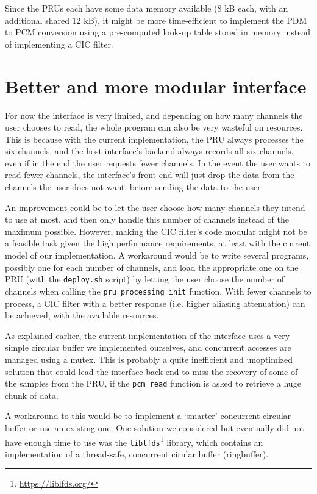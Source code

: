 \documentclass[]{report}
\begin{document}
Since the PRUs each have some data memory available (8 kB each, with an additional shared 12 kB), it might be more time-efficient to implement the PDM to PCM conversion using a pre-computed look-up table stored in memory instead of implementing a CIC filter.

\hypertarget{better-and-more-modular-interface}{%
\section{Better and more modular
interface}\label{better-and-more-modular-interface}}

For now the interface is very limited, and depending on how many channels the user chooses to read, the whole program can also be very wasteful on resources. This is because with the current implementation, the PRU always processes the six channels, and the host interface's backend always records all six channels, even if in the end the user requests fewer channels. In the event the user wants to read fewer channels, the interface's front-end will just drop the data from the channels the user does not want, before sending the data to the user.

An improvement could be to let the user choose how many channels they intend to use at most, and then only handle this number of channels instead of the maximum possible. However, making the CIC filter's code modular might not be a feasible task given the high performance requirements, at least with the current model of our implementation. A workaround would be to write several programs, possibly one for each number of channels, and load the appropriate one on the PRU (with the \texttt{deploy.sh} script) by letting the user choose the number of channels when calling the \texttt{pru\_processing\_init} function. With fewer channels to process, a CIC filter with a better response (i.e. higher aliasing attenuation) can be achieved, with the available resources.

As explained earlier, the current implementation of the interface uses a very simple circular buffer we implemented ourselves, and concurrent accesses are managed using a mutex. This is probably a quite inefficient and unoptimized solution that could lead the interface back-end to miss the recovery of some of the samples from the PRU, if the \texttt{pcm\_read} function is asked to retrieve a huge chunk of data.

A workaround to this would be to implement a `smarter' concurrent circular buffer or use an existing one. One solution we considered but eventually did not have enough time to use was the \texttt{liblfds}\footnote{\url{https://liblfds.org/}} library, which contains an implementation of a thread-safe, concurrent cirular buffer (ringbuffer).
\end{document}
